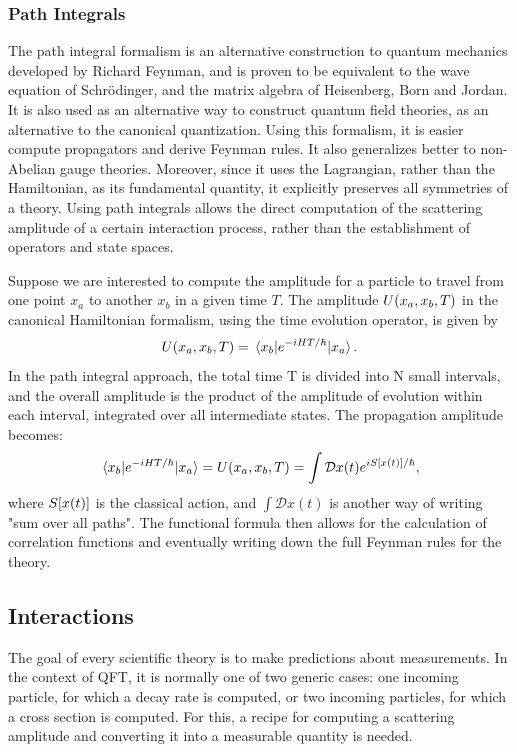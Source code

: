 \subsubsection{Path Integrals}
\label{sec:path-integrals}

The path integral formalism is an alternative construction to quantum mechanics developed by Richard Feynman, and is proven to be equivalent to the wave equation of Schrödinger, and the matrix algebra of Heisenberg, Born and Jordan. It is also used as an alternative way to construct quantum field theories, as an alternative to the canonical quantization. Using this formalism, it is easier compute propagators and derive Feynman rules. It also generalizes better to non-Abelian gauge theories. Moreover, since it uses the Lagrangian, rather than the Hamiltonian, as its fundamental quantity, it explicitly preserves all symmetries of a theory. Using path integrals allows the direct computation of the scattering amplitude of a certain interaction process, rather than the establishment of operators and state spaces. 

Suppose we are interested to compute the amplitude for a particle to travel from one point $x_a$ to another $x_b$ in a given time $T$. The amplitude $U\qty(x_a,x_b,T)$ in the canonical Hamiltonian formalism, using the time evolution operator, is given by
\begin{equation}
U\qty(x_a,x_b,T)=\mel{x_b}{e^{-iHT/\hbar}}{x_a}.
\end{equation}
In the path integral approach, the total time T is divided into N small intervals, and the overall amplitude is the product of the amplitude of evolution within each interval, integrated over all intermediate states. The propagation amplitude becomes:
\begin{equation}
\mel{x_b}{e^{-iHT/\hbar}}{x_a}=U\qty(x_a,x_b,T)=\int \mathcal{D}x(t)e^{iS\qty[x(t)]/\hbar},
\end{equation}
where $S\qty[x(t)]$ is the classical action, and $\int \mathcal{D}x(t)$ is another way of writing "sum over all paths". The functional formula then allows for the calculation of correlation functions and eventually writing down the full Feynman rules for the theory.

\subsection{Interactions}

The goal of every scientific theory is to make predictions about measurements. In the context of QFT, it is normally one of two generic cases: one incoming particle, for which a decay rate is computed, or two incoming particles, for which a cross section is computed. For this, a recipe for computing a scattering amplitude and converting it into a measurable quantity is needed.


